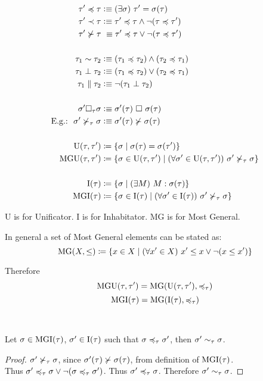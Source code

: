 \documentclass[a4paper,oneside]{memoir}
\begin{document}
\begin{definition}
\begin{align*}
\tauPr \tord  \tau   &\defe \E{\sigma}{\tauPr = \sigma(\tau)} \\
\tauPr \stord \tau   &\defe \tauPr \tord \tau \wedge \neg (\tau \tord \tauPr) \\
\tauPr \nsucc \tau &\ \equiv \tauPr \tord \tau \vee  \neg ( \tau \tord \tauPr)   \\   
\\
\tau_1 \tek      \tau_2  &\defe  (\tau_1 \tord \tau_2) \wedge (\tau_2 \tord \tau_1) \\
\tau_1 \perp     \tau_2  &\defe  (\tau_1 \tord \tau_2) \vee (\tau_2 \tord \tau_1) \\
\tau_1 \parallel \tau_2  &\defe  \neg (\tau_1 \perp  \tau_2) \\
\\
\sigmaPr \square_\tau \sigma   &\defe   \sigmaPr(\tau)\ \square\ \sigma(\tau)\\
\text{E.g.:~~} \sigmaPr \nsucct \sigma  &\defe  \sigmaPr(\tau) \nsucc \sigma(\tau)\\
\\
\Utt &\defi \{ \s \mid \s(\tau) = \s(\tauPr) \}\\
\MGUtt &\defi \{ \s \in \Utt \mid \A{\sPr \in \Utt}{\sPr \nsucct \s}  \}\\
\\
\It &\defi \{ \sigma \mid \E{M}{M : \sigma(\tau)}  \} \\
\MGI{\tau} &\defi \{ \sigma \in \It \mid \Ain{\sigmaPr}{\It}{\sigmaPr \nsucct \sigma}  \}\\
\end{align*}
\end{definition}


U is for Unificator. I is for Inhabitator. MG is for Most General. 

In general a set of Most General elements can be stated as:
$$\op{MG}(X,\leq) \defi \{ x \in X \mid \Ain{\xPr}{X}{\xPr \leq x \vee \neg(x \leq \xPr)} \}$$

Therefore 
$$\MGUtt = \op{MG}(\Utt,\ordt)$$
$$\MGIt  = \op{MG}(\It, \ordt)$$

~

\begin{lemma}
Let $\sigma \in \MGIt$, $\sigmaPr \in \It$ such that $\sigma \ordt \sigmaPr$,
then $\sigmaPr \ekt \sigma$.
\end{lemma}
\begin{proof}
$\sigmaPr \nsucct \sigma$, since $\sigmaPr(\tau) \nsucc \sigma(\tau)$, from definition of $\MGIt$.\\
Thus $\sigmaPr \ordt \sigma \vee \neg( \sigma \ordt \sigmaPr )$.
Thus $\sigmaPr \ordt \sigma$.
Therefore $\sigmaPr \ekt \sigma$.
\end{proof}
\end{document}
